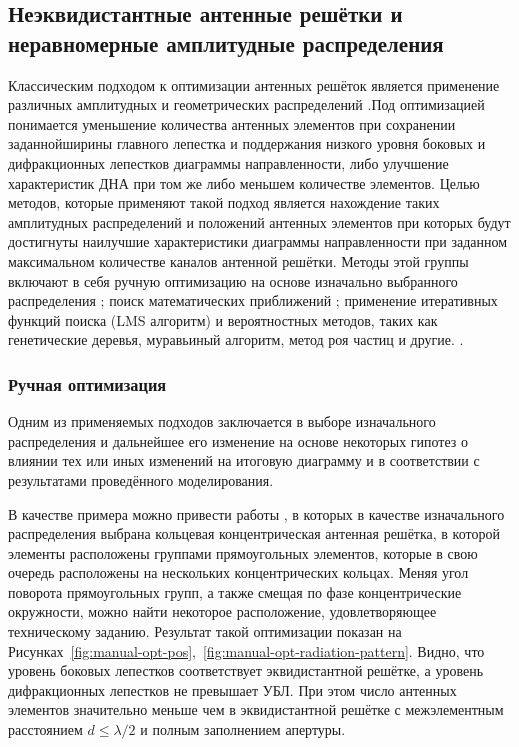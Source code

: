 \subsection{Неэквидистантные антенные решётки и неравномерные амплитудные распределения}\label{sect:distributions-theory}


Классическим подходом к оптимизации антенных решёток является применение различных амплитудных и геометрических
распределений \cite{harrington1961sidelobe, ma1963note, brown1962note}.Под оптимизацией понимается уменьшение
количества антенных элементов при сохранении заданнойширины главного лепестка и поддержания низкого уровня
боковых и дифракционных лепестков диаграммы направленности, либо улучшение
характеристик ДНА при том же либо меньшем количестве элементов.
Целью методов, которые применяют такой подход является нахождение таких амплитудных распределений и положений
антенных элементов при которых будут достигнуты наилучшие характеристики диаграммы направленности при
заданном максимальном количестве каналов антенной решётки. Методы этой группы включают в себя ручную
оптимизацию на основе изначально выбранного распределения \cite{lyalin2019, kuzmin2019ring, andreasen1962linear};
поиск математических приближений \cite{ishimaru1962theory, harrington1961sidelobe};
применение итеративных функций поиска (LMS алгоритм)\cite{ma1997weighted} и вероятностных методов,
таких как генетические деревья, муравьиный алгоритм, метод роя частиц и другие.
\cite{jain2012solving, dubey2023cosecant, luo2015synthesis}.

\subsubsection{Ручная оптимизация}\label{sec:manual-optimization}

Одним из применяемых подходов заключается в выборе изначального распределения и дальнейшее его изменение
на основе некоторых гипотез о влиянии тех или иных изменений на итоговую диаграмму и в
соответствии с результатами проведённого моделирования.

В качестве примера можно привести работы \cite{lyalin2019, kuzmin2019ring}, в которых в качестве
изначального распределения выбрана кольцевая концентрическая антенная решётка, в которой элементы
расположены группами прямоугольных элементов, которые в свою очередь расположены на нескольких
концентрических кольцах. Меняя угол поворота прямоугольных групп, а также смещая по фазе концентрические
окружности, можно найти некоторое расположение, удовлетворяющее техническому заданию.
Результат такой оптимизации показан на Рисунках~\ref{fig:manual-opt-pos},~\ref{fig:manual-opt-radiation-pattern}.
Видно, что уровень боковых лепестков соответствует эквидистантной решётке, а уровень
дифракционных лепестков не превышает УБЛ. При этом число антенных элементов
значительно меньше чем в эквидистантной решётке с межэлементным расстоянием $d \leq \lambda/2$ и полным заполнением апертуры.


